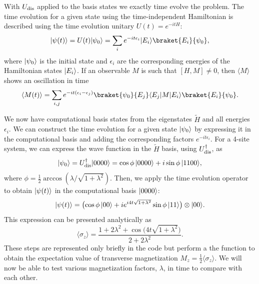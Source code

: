 \documentclass[12pt]{article}
\newcommand*{\eu}{e}
\newcommand*{\iu}{i}
\DeclarePairedDelimiter{\bra}{\langle}{\rvert}
\DeclarePairedDelimiter{\ket}{\lvert}{\rangle}
\begin{document}
  With \( U_{\textnormal{dis}} \) applied to the basis states we exactly time evolve the problem. The time evolution for a given state using the time-independent Hamiltonian is described using the time evolution unitary \( U(t) = \eu^{-\iu t H} \):
  \begin{equation}
    \ket{\psi(t)}
      = U(t) \ket{\psi_{0}}
      = \sum_{i} \eu^{-\iu t \epsilon_{i}} \ket{E_{i}} \braket{E_{i}}{\psi_{0}},
  \end{equation}
  where \( \ket{\psi_{0}} \) is the initial state and \( \epsilon_{i} \) are the corresponding energies of the Hamiltonian states \( \ket{E_{i}} \). If an observable \( M \) is such that \( [H, M] \neq 0 \), then \( \langle M \rangle \) shows an oscillation in time
  \begin{equation}
    \langle M(t) \rangle
      = \sum_{i, j} \eu^{-\iu t (\epsilon_{i} - \epsilon_{j})}
        \braket{\psi_{0}}{E_{j}} \bra{E_{j}} M \ket{E_{i}}
        \braket{E_{i}}{\psi_{0}}.
  \end{equation}

  We now have computational basis states from the eigenstates \( \tilde{H} \) and all energies \( \epsilon_{i} \). We can construct the time evolution for a given state \( \ket{\psi_{0}} \) by expressing it in the computational basis and adding the corresponding factors \( \eu^{-\iu t \epsilon_{i}} \). For a 4-site system, we can express the wave function in the \( \tilde{H} \) basis, using \( U_{\textnormal{dis}}^{\dagger} \), as
  \begin{equation}
    \ket{\psi_{0}}
      = U_{\textnormal{dis}}^{\dagger} \ket{0000}
      = \cos \phi \mathop{} \ket{0000} + \iu \sin \phi \mathop{} \ket{1100},
  \end{equation}
  where \( \phi = \frac{1}{2} \arccos(\lambda / \sqrt{1 + \lambda^{2}}) \). Then, we apply the time evolution operator to obtain \( \ket{\psi(t)} \) in the computational basis \( \ket{0000} \):
  \begin{equation}
    \ket{\psi (t)}
      = \bigl(
          \cos \phi \mathop{} \ket{00}
          + \iu \eu^{\iu 4 t \sqrt{1 + \lambda^{2}}}
            \sin \phi \mathop{} \ket{11}
        \bigr)
        \otimes \ket{00}.
  \end{equation}
  This expression can be presented analytically as
  \begin{equation}
    \langle \sigma_{z} \rangle
      = \frac{1 + 2 \lambda^{2} + \cos \bigl( 4 t \sqrt{1 + \lambda^{2}} \bigr)}
             {2 + 2 \lambda^{2}}.
  \end{equation}
  These steps are represented only briefly in the code but perform a the function to obtain the expectation value of transverse magnetization \( M_{z} = \frac{1}{2} \langle \sigma_{z} \rangle \). We will now be able to test various magnetization factors, \( \lambda \), in time to compare with each other.
\end{document}
